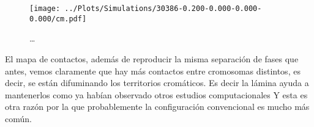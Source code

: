 \begin{figure}
    \centering
    \texttt{[image: ../Plots/Simulations/30386-0.200-0.000-0.000-0.000/cm.pdf]}
    \caption{\dots}
    \label{fig:cm_i}
\end{figure}

El mapa de contactos, además de reproducir la misma separación de fases que antes, vemos claramente que hay más contactos entre cromosomas distintos, es decir, se están difuminando los territorios cromáticos. Es decir la lámina ayuda a mantenerlos como ya habían observado otros estudios computacionales \cite{Kinney2018} Y esta es otra razón por la que probablemente la configuración convencional es mucho más común.
